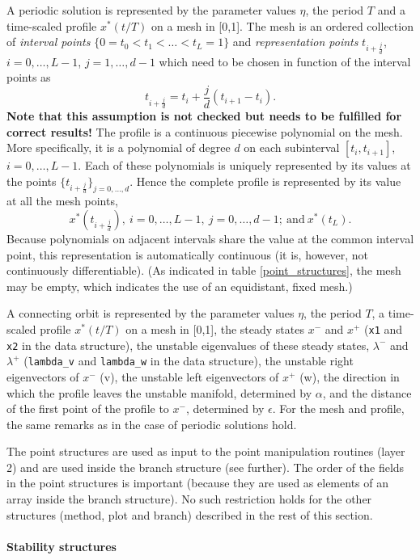 \documentclass[10pt]{article}
\gdef \define#1{{\em{#1}}}
\begin{document}
{A periodic solution is represented by the parameter
values $\eta$, the period $T$ and 
a time-scaled profile $x^*(t/T)$ on a mesh in [0,1].
The mesh is an ordered 
collection of \define{interval points} $\{0=t_0<t_1<\ldots<t_L=1\}$
and \define{representation points} $t_{i+\frac{j}{d}}$, $i=0,\ldots,L-1$,
$j=1,\ldots,d-1$ which need to be chosen in function of the interval points as
\[
t_{i+\frac{j}{d}}=t_i+\frac{j}{d}(t_{i+1}-t_i).
\]
{\bf
Note that this assumption is not checked but needs to be fulfilled for
correct results!}
The profile is a continuous piecewise polynomial on the mesh. 
More specifically, it is
a polynomial of degree $d$ on each
subinterval $[t_i,t_{i+1}]$, $i=0,\ldots,L-1$.
Each of these polynomials is uniquely represented
by its values at the points $\{t_{i+\frac{j}{d}}\}_{j=0,\ldots,d}$.
Hence the complete profile is represented by
its value at all the mesh points,
\[
x^*(t_{i+\frac{j}{d}}),\ i=0,\ldots,L-1,\ j=0,\ldots,d-1;
\mathrm{\ and\ } x^*(t_L).
\]
Because polynomials on adjacent intervals share the value
at the common interval point, this representation is automatically
continuous (it is, however, not continuously differentiable).
(As indicated in table \ref{point_structures}, the mesh may be empty, 
which indicates the use of an equidistant, fixed mesh.)

A connecting orbit is represented by the parameter
values $\eta$, the period $T$,
a time-scaled profile $x^*(t/T)$ on a mesh in [0,1], the steady states 
$x^-$ and $x^+$ (\verb#x1# and \verb#x2# in the data structure), the unstable eigenvalues
of these steady states, $\lambda^-$ and $\lambda^+$ 
(\verb#lambda_v# and \verb#lambda_w# in the data structure),  the unstable
right eigenvectors of $x^-$ (v), the unstable left eigenvectors of $x^+$ (w),
the direction in which the profile leaves the unstable 
manifold, determined by $\alpha$, and the distance of
the first point of the profile to $x^-$, determined by $\epsilon$.
For the mesh and profile, the same remarks as in the case of periodic solutions
hold.

The point structures are used as input to the point
manipulation routines (layer 2) and are used inside
the branch structure (see further). The order of the fields in the point 
structures is important (because they are used as elements
of an array inside the branch structure).
No such restriction holds for the other structures (method, plot and
branch) described in the rest of this section.

\paragraph{Stability structures}

}
\end{document}
